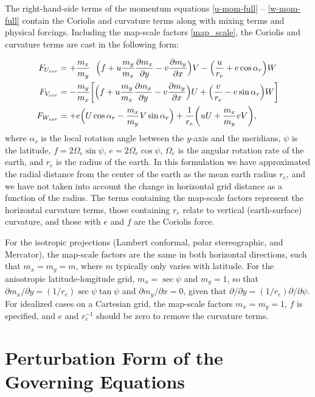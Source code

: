 The right-hand-side terms of the momentum equations
\eqref{u-mom-full} -- \eqref{w-mom-full} contain the Coriolis and 
curvature terms along with mixing terms and 
physical forcings.  Including the map-scale factors \eqref{map_scale}, the Coriolis and
curvature terms are cast in the following form:

\begin{align}
F_{U_{cor}} & =  + {m_x\over m_y}
\ \ \Bigl(f + u {m_y\over m_x}{\partial m_x \over
\partial y} - v {\partial m_y \over \partial x}\Bigr) V
- \Bigl( {u \over r_e}  + e \cos \alpha_r \Bigr)W \label{u-mom-rhs} 
\\
%
F_{V_{cor}} & = - {m_y\over m_x}\biggl[ \Bigl(f + u {m_y\over m_x}{\partial m_x \over
\partial y} - v {\partial m_y \over \partial x}\Bigr) U
+ \Bigl( {v \over r_e} -e \sin \alpha_r \Bigr)W \biggr] \label{v-mom-rhs} 
\\
%
F_{W_{cor}} & = + e \Bigl(U \cos \alpha_r - {m_x\over m_y}V \sin \alpha_r\Bigr) 
+ {1\over r_e}\biggl(uU +{m_x\over m_y}vV \biggr), \label{w-mom-rhs}
\end{align}
\noindent
where $\alpha_r$ is the local rotation angle between the $y$-axis and the
meridians, $\psi$ is the latitude, $f = 2 \Omega_e \sin \psi $, $e = 2
\Omega_e \cos \psi$, $\Omega_e$ is the angular rotation rate of the earth,
and $r_e$ is the radius of the earth.  In this
formulation we have approximated the radial distance from the center of
the earth as the mean earth radius $r_e$, and we have not taken into account
the change in horizontal grid distance as a function of the radius.
The terms containing the map-scale factors represent the horizontal curvature terms, those
containing $r_e$ relate to vertical (earth-surface) curvature, and those
with $e$ and $f$ are the Coriolis force.


 For the isotropic projections 
(Lambert conformal, polar stereographic, and Mercator), the map-scale factors are the same in both horizontal directions, such that $m_x=m_y=m$,
where $m$ typically only varies with latitude. 
For the anisotropic latitude-longitude grid, $m_x=\sec\psi$ and $m_y=1$, so that $\partial m_x/\partial y  = (1/r_e) \sec \psi \tan \psi$ and $\partial m_y/\partial x  = 0$, 
given that $\partial / \partial y = (1/r_e)\partial/\partial \psi$.
For idealized cases on a Cartesian grid, the map-scale factors $m_x = m_y = 1$, 
$f$ is specified, and $e$ and $r_e^{-1}$ should be zero to remove the curvature terms.

\section{Perturbation Form of the Governing Equations}

